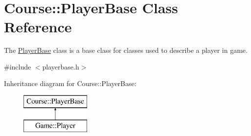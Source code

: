 \hypertarget{classCourse_1_1PlayerBase}{\section{Course\-:\-:Player\-Base Class Reference}
\label{classCourse_1_1PlayerBase}
}


The \hyperlink{classCourse_1_1PlayerBase}{Player\-Base} class is a base class for classes used to describe a player in game.  




{\ttfamily \#include $<$playerbase.\-h$>$}

Inheritance diagram for Course\-:\-:Player\-Base\-:\begin{figure}[H]
\begin{center}
\leavevmode
\includegraphics[height=2.000000cm]{classCourse_1_1PlayerBase}
\end{center}
\end{figure}
